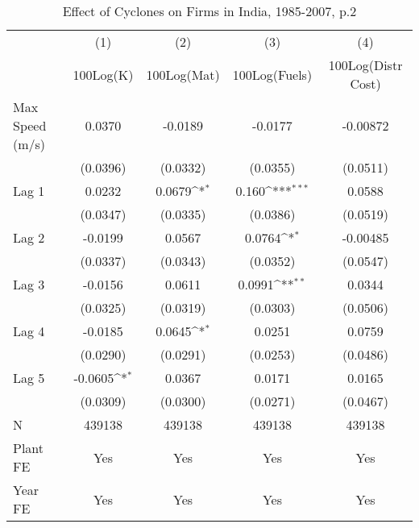\begin{table}[htbp]\centering
\def\sym#1{\ifmmode^{#1}\else\(^{#1}\)\fi}
\caption{Effect of Cyclones on Firms in India, 1985-2007, p.2}
\begin{tabular}{l*{4}{c}}
\toprule
                &\multicolumn{1}{c}{(1)}&\multicolumn{1}{c}{(2)}&\multicolumn{1}{c}{(3)}&\multicolumn{1}{c}{(4)}\\
                &\multicolumn{1}{c}{100Log(K)}&\multicolumn{1}{c}{100Log(Mat)}&\multicolumn{1}{c}{100Log(Fuels)}&\multicolumn{1}{c}{100Log(Distr Cost)}\\
\midrule
Max Speed (m/s) &   0.0370         &  -0.0189         &  -0.0177         & -0.00872         \\
                & (0.0396)         & (0.0332)         & (0.0355)         & (0.0511)         \\
\addlinespace
Lag 1           &   0.0232         &   0.0679\sym{*}  &    0.160\sym{***}&   0.0588         \\
                & (0.0347)         & (0.0335)         & (0.0386)         & (0.0519)         \\
\addlinespace
Lag 2           &  -0.0199         &   0.0567         &   0.0764\sym{*}  & -0.00485         \\
                & (0.0337)         & (0.0343)         & (0.0352)         & (0.0547)         \\
\addlinespace
Lag 3           &  -0.0156         &   0.0611         &   0.0991\sym{**} &   0.0344         \\
                & (0.0325)         & (0.0319)         & (0.0303)         & (0.0506)         \\
\addlinespace
Lag 4           &  -0.0185         &   0.0645\sym{*}  &   0.0251         &   0.0759         \\
                & (0.0290)         & (0.0291)         & (0.0253)         & (0.0486)         \\
\addlinespace
Lag 5           &  -0.0605\sym{*}  &   0.0367         &   0.0171         &   0.0165         \\
                & (0.0309)         & (0.0300)         & (0.0271)         & (0.0467)         \\
\midrule
N               &   439138         &   439138         &   439138         &   439138         \\
Plant FE        &      Yes         &      Yes         &      Yes         &      Yes         \\
Year FE         &      Yes         &      Yes         &      Yes         &      Yes         \\

\end{tabular}
\end{table}
